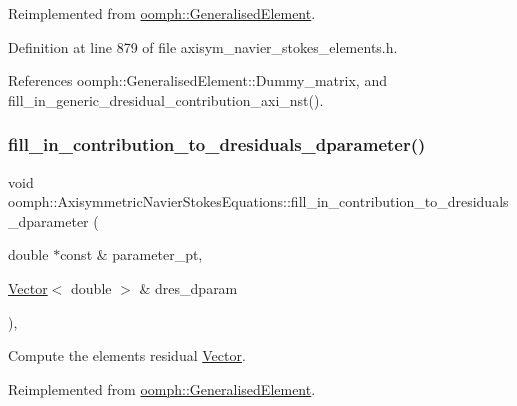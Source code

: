 Reimplemented from \hyperlink{classoomph_1_1GeneralisedElement_a90ee6ee39dd3950f625148d960f1ba67}{oomph\+::\+Generalised\+Element}.



Definition at line 879 of file axisym\+\_\+navier\+\_\+stokes\+\_\+elements.\+h.



References oomph\+::\+Generalised\+Element\+::\+Dummy\+\_\+matrix, and fill\+\_\+in\+\_\+generic\+\_\+dresidual\+\_\+contribution\+\_\+axi\+\_\+nst().

\mbox{\label{classoomph_1_1AxisymmetricNavierStokesEquations_aa43f48866735deb28609372232b8cd2a}} 
\subsubsection{\texorpdfstring{fill\+\_\+in\+\_\+contribution\+\_\+to\+\_\+dresiduals\+\_\+dparameter()}{fill\_in\_contribution\_to\_dresiduals\_dparameter()}}
{\footnotesize\ttfamily void oomph\+::\+Axisymmetric\+Navier\+Stokes\+Equations\+::fill\+\_\+in\+\_\+contribution\+\_\+to\+\_\+dresiduals\+\_\+dparameter (\begin{DoxyParamCaption}\item[{double $\ast$const \&}]{parameter\+\_\+pt,  }\item[{\hyperlink{classoomph_1_1Vector}{Vector}$<$ double $>$ \&}]{dres\+\_\+dparam }\end{DoxyParamCaption})\hspace{0.3cm}{\ttfamily [inline]}, {\ttfamily [virtual]}}



Compute the element\textquotesingle{}s residual \hyperlink{classoomph_1_1Vector}{Vector}. 



Reimplemented from \hyperlink{classoomph_1_1GeneralisedElement_a64d31806fcbe7c5b689a3281932e8073}{oomph\+::\+Generalised\+Element}.



